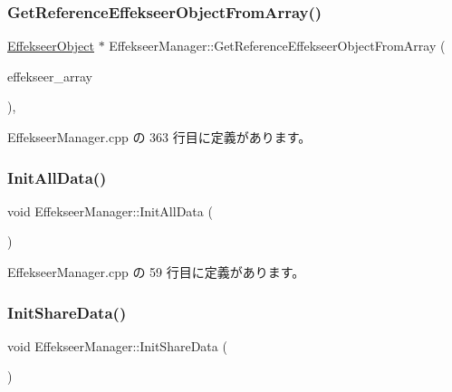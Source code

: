 \subsubsection{\texorpdfstring{Get\+Reference\+Effekseer\+Object\+From\+Array()}{GetReferenceEffekseerObjectFromArray()}}
{\footnotesize\ttfamily \mbox{\hyperlink{class_effekseer_object}{Effekseer\+Object}} $\ast$ Effekseer\+Manager\+::\+Get\+Reference\+Effekseer\+Object\+From\+Array (\begin{DoxyParamCaption}\item[{\mbox{\hyperlink{class_effekseer_array}{Effekseer\+Array}} $\ast$}]{effekseer\+\_\+array }\end{DoxyParamCaption})\hspace{0.3cm}{\ttfamily [static]}, {\ttfamily [private]}}



 Effekseer\+Manager.\+cpp の 363 行目に定義があります。

\mbox{\label{class_effekseer_manager_ac5744fba29048e417bf46a8fbf5a8e76}} 
\subsubsection{\texorpdfstring{Init\+All\+Data()}{InitAllData()}}
{\footnotesize\ttfamily void Effekseer\+Manager\+::\+Init\+All\+Data (\begin{DoxyParamCaption}{ }\end{DoxyParamCaption})\hspace{0.3cm}{\ttfamily [static]}}



 Effekseer\+Manager.\+cpp の 59 行目に定義があります。

\mbox{\label{class_effekseer_manager_a881d9bdd981c35de66174363517050b4}} 
\subsubsection{\texorpdfstring{Init\+Share\+Data()}{InitShareData()}}
{\footnotesize\ttfamily void Effekseer\+Manager\+::\+Init\+Share\+Data (\begin{DoxyParamCaption}{ }\end{DoxyParamCaption})\hspace{0.3cm}{\ttfamily [static]}}



